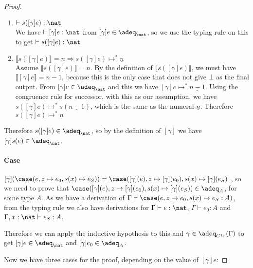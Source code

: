 \begin{proof}
\begin{enumerate}
\item{$\vdash s([\gamma]e) : \nat$ \\
We have $\vdash [\gamma]e : \nat$ from $[\gamma]e \in \adeq_{\nat}$, so we use the typing rule on this to get $\vdash s([\gamma]e) : \nat$}
\item{\textbf{$\llbracket s([\gamma]e) \rrbracket = n \Rightarrow s([\gamma]e) \mapsto^* \underline{n}$} \\
Assume $\llbracket s([\gamma]e) \rrbracket = n$. By the definition of $\llbracket s([\gamma]e) \rrbracket$, we  must have $\llbracket [\gamma]e \rrbracket = n - 1$, because this is the only case that does not give $\bot$ as the final output. From $[\gamma]e \in \adeq_{\nat}$ and this we have $[\gamma]e \mapsto^* \underline{n - 1}$. Using the congruence rule for successor, with this as our assumption, we have $s([\gamma]e) \mapsto^* s(\underline{n -1})$, which is the same as the numeral $\underline{n}$. Therefore $s([\gamma]e) \mapsto^* \underline{n}$
}\end{enumerate}

Therefore $s([\gamma]e) \in \adeq_{\nat}$, so  by the definition of $[\gamma]$ we have $[\gamma]s(e)  \in \adeq_{\nat}$.

\paragraph{Case} $[\gamma](\case (e, z \mapsto e_0, s(x) \mapsto e_S)) = \case ([\gamma](e), z \mapsto [\gamma](e_0), s(x) \mapsto [\gamma](e_S)$ , so we need to prove that $\case ([\gamma](e), z \mapsto [\gamma](e_0), s(x) \mapsto [\gamma](e_S)) \in \adeq_A$, for some type $A$. As we have a derivation of $\Gamma \vdash \case (e, z \mapsto e_0, s(x) \mapsto e_S : A)$, from the typing rule we also have derivations for $\Gamma \vdash e : \nat$, $\Gamma \vdash e_0 : A$ and $\Gamma , x : \nat \vdash e_S : A$.

 Therefore we can apply the inductive hypothesis to this and $\gamma \in \adeq_{Ctx}(\Gamma)$ to get $[\gamma]e \in \adeq_{\nat}$ and $[\gamma]e_0 \in \adeq_A$. 

 
Now we have three cases for the proof, depending on the value of $[\gamma]e$:


\end{proof}
